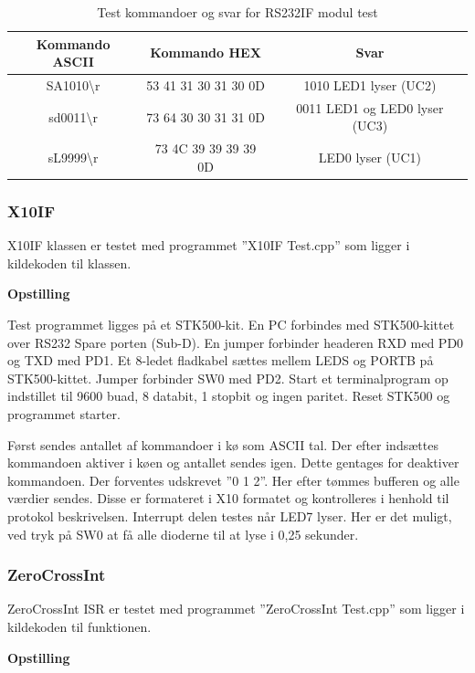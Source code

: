 \begin{table}[h]
	\caption{Test kommandoer og svar for RS232IF modul test}
	\centering
	\begin{tabular}{|c|c|c|}
		\hline 
		\textbf{Kommando ASCII} & \textbf{Kommando HEX} & \textbf{Svar} \\ 
		\hline 
		SA1010\textbackslash r & 53 41 31 30 31 30 0D & 1010 LED1 lyser (UC2) \\ 
		\hline 
		sd0011\textbackslash r & 73 64 30 30 31 31 0D & 0011 LED1 og LED0 lyser (UC3) \\ 
		\hline 
		sL9999\textbackslash r & 73 4C 39 39 39 39 0D & LED0 lyser (UC1) \\ 
		\hline 
	\end{tabular} 
	\label{table:Test_RS232IF_kommandoer}
\end{table}

\subsubsection{X10IF}
X10IF klassen er testet med programmet ''X10IF Test.cpp'' som ligger i kildekoden til klassen.

\textbf{Opstilling}

Test programmet ligges på et STK500-kit.
En PC forbindes med STK500-kittet over RS232 Spare porten (Sub-D).
En jumper forbinder headeren RXD med PD0 og TXD med PD1. Et 8-ledet fladkabel sættes mellem LEDS og PORTB på STK500-kittet. Jumper forbinder SW0 med PD2.
Start et terminalprogram op indstillet til 9600 buad, 8 databit, 1 stopbit og ingen paritet.
Reset STK500 og programmet starter.

Først sendes antallet af kommandoer i kø som ASCII tal. Der efter indsættes kommandoen aktiver i køen og antallet sendes igen. Dette gentages for deaktiver kommandoen. Der forventes udskrevet ''0 1 2''.
Her efter tømmes bufferen og alle værdier sendes. Disse er formateret i X10 formatet og kontrolleres i henhold til protokol beskrivelsen.
Interrupt delen testes når LED7 lyser. Her er det muligt, ved tryk på SW0 at få alle dioderne til at lyse i 0,25 sekunder.
 
\subsubsection{ZeroCrossInt}
ZeroCrossInt ISR er testet med programmet ''ZeroCrossInt Test.cpp'' som ligger i kildekoden til funktionen.

\textbf{Opstilling}

